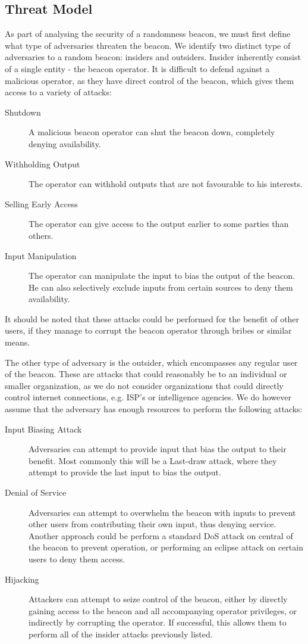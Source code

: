 \subsection{Threat Model}
As part of analysing the security of a randomness beacon, we must first define what type of adversaries threaten the beacon. We identify two distinct type of adversaries to a random beacon: insiders and outsiders. Insider inherently consist of a single entity - the beacon operator. It is difficult to defend against a malicious operator, as they have direct control of the beacon, which gives them access to a variety of attacks:

\begin{description}
    \item [Shutdown] A malicious beacon operator can shut the beacon down, completely denying availability. 
    \item [Withholding Output] The operator can withhold outputs that are not favourable to his interests. 
    \item [Selling Early Access] The operator can give access to the output earlier to some parties than others.
    \item [Input Manipulation] The operator can manipulate the input to bias the output of the beacon. He can also selectively exclude inputs from certain sources to deny them availability. 

\end{description} 

It should be noted that these attacks could be performed for the benefit of other users, if they manage to corrupt the beacon operator through bribes or similar means. 

The other type of adversary is the outsider, which encompasses any regular user of the beacon. These are attacks that could reasonably be to an individual or smaller organization, as we do not consider organizations that could directly control internet connections, e.g. ISP's or intelligence agencies. We do however assume that the adversary has enough resources to perform the following attacks: 

\begin{description}
    \item [Input Biasing Attack] Adversaries can attempt to provide input that bias the output to their benefit. Most commonly this will be a Last-draw attack, where they attempt to provide the last input to bias the output. 
    \item [Denial of Service] Adversaries can attempt to overwhelm the beacon with inputs to prevent other users from contributing their own input, thus denying service. Another approach could be perform a standard \gls{DoS} attack on central of the beacon to prevent operation, or performing an eclipse attack on certain users to deny them access. 
    \item [Hijacking] Attackers can attempt to seize control of the beacon, either by directly gaining access to the beacon and all accompanying operator privileges, or indirectly by corrupting the operator. If successful, this allows them to perform all of the insider attacks previously listed.  
\end{description}



